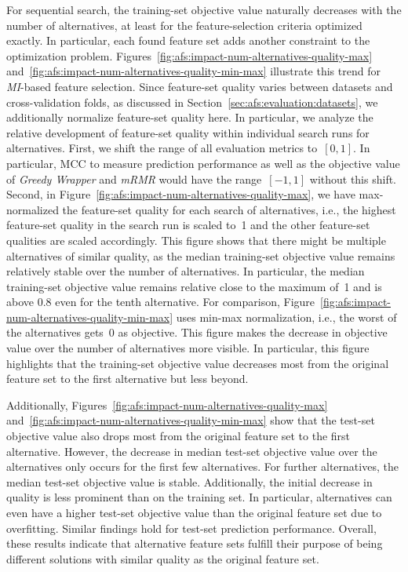 \documentclass{article}
\theoremstyle{definition}
\begin{document}
For sequential search, the training-set objective value naturally decreases with the number of alternatives, at least for the feature-selection criteria optimized exactly.
In particular, each found feature set adds another constraint to the optimization problem.
Figures~\ref{fig:afs:impact-num-alternatives-quality-max} and~\ref{fig:afs:impact-num-alternatives-quality-min-max} illustrate this trend for \emph{MI}-based feature selection.
Since feature-set quality varies between datasets and cross-validation folds, as discussed in Section~\ref{sec:afs:evaluation:datasets}, we additionally normalize feature-set quality here.
In particular, we analyze the relative development of feature-set quality within individual search runs for alternatives.
First, we shift the range of all evaluation metrics to~$[0,1]$.
In particular, MCC to measure prediction performance as well as the objective value of \emph{Greedy Wrapper} and \emph{mRMR} would have the range~$[-1,1]$ without this shift.
Second, in Figure~\ref{fig:afs:impact-num-alternatives-quality-max}, we have max-normalized the feature-set quality for each search of alternatives, i.e., the highest feature-set quality in the search run is scaled to~1 and the other feature-set qualities are scaled accordingly.
This figure shows that there might be multiple alternatives of similar quality, as the median training-set objective value remains relatively stable over the number of alternatives.
In particular, the median training-set objective value remains relative close to the maximum of~1 and is above 0.8 even for the tenth alternative.
For comparison, Figure~\ref{fig:afs:impact-num-alternatives-quality-min-max} uses min-max normalization, i.e., the worst of the alternatives gets~0 as objective.
This figure makes the decrease in objective value over the number of alternatives more visible.
In particular, this figure highlights that the training-set objective value decreases most from the original feature set to the first alternative but less beyond.

Additionally, Figures~\ref{fig:afs:impact-num-alternatives-quality-max} and~\ref{fig:afs:impact-num-alternatives-quality-min-max} show that the test-set objective value also drops most from the original feature set to the first alternative.
However, the decrease in median test-set objective value over the alternatives only occurs for the first few alternatives.
For further alternatives, the median test-set objective value is stable.
Additionally, the initial decrease in quality is less prominent than on the training set.
In particular, alternatives can even have a higher test-set objective value than the original feature set due to overfitting.
Similar findings hold for test-set prediction performance.
Overall, these results indicate that alternative feature sets fulfill their purpose of being different solutions with similar quality as the original feature set.
\end{document}

